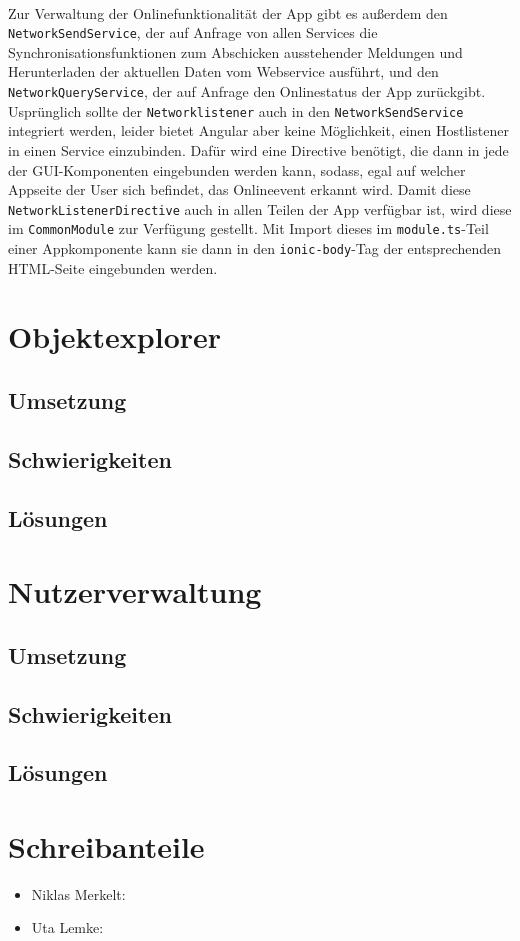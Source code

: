 \documentclass[12pt]{article}
\begin{document}
\paragraph{}
Zur Verwaltung der Onlinefunktionalität der App gibt es außerdem den \texttt{NetworkSendService}, der auf Anfrage von allen Services die Synchronisationsfunktionen zum Abschicken ausstehender Meldungen und Herunterladen der aktuellen Daten vom Webservice ausführt, und den \texttt{NetworkQueryService}, der auf Anfrage den Onlinestatus der App zurückgibt. Usprünglich sollte der \texttt{Networklistener} auch in den \texttt{NetworkSendService} integriert werden, leider bietet Angular aber keine Möglichkeit, einen Hostlistener in einen Service einzubinden. Dafür wird eine Directive benötigt, die dann in jede der GUI-Komponenten eingebunden werden kann, sodass, egal auf welcher Appseite der User sich befindet, das Onlineevent erkannt wird. Damit diese \texttt{NetworkListenerDirective} auch in allen Teilen der App verfügbar ist, wird diese im \texttt{CommonModule} zur Verfügung gestellt. Mit Import dieses im \texttt{module.ts}-Teil einer Appkomponente kann sie dann in den \texttt{ionic-body}-Tag der entsprechenden HTML-Seite eingebunden werden.

\section{Objektexplorer}
\subsection{Umsetzung}
\subsection{Schwierigkeiten}
\subsection{Lösungen}

\section{Nutzerverwaltung}
\subsection{Umsetzung}
\subsection{Schwierigkeiten}
\subsection{Lösungen}

\section{Schreibanteile}
\begin{itemize}
	\item Niklas Merkelt:
	\item Uta Lemke:
\end{itemize}
\end{document}
